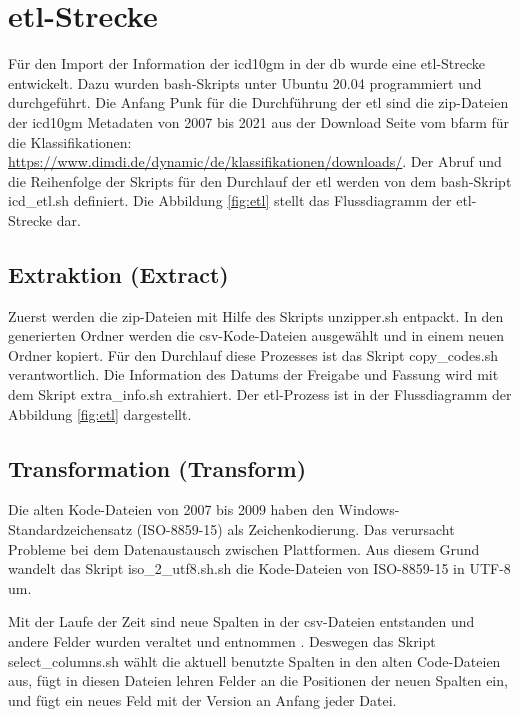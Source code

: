 \section{\acs{etl}-Strecke} \label{etlpipeline}

Für den Import der Information der \ac{icd10gm} in der \ac{db} wurde eine \ac{etl}-Strecke entwickelt. Dazu wurden \ac{bash}-Skripts unter Ubuntu 20.04 programmiert und durchgeführt. Die Anfang Punk für die Durchführung der \ac{etl} sind die \ac{zip}-Dateien der \ac{icd10gm} Metadaten von 2007 bis 2021 aus der Download Seite vom \ac{bfarm} für die Klassifikationen: \url{https://www.dimdi.de/dynamic/de/klassifikationen/downloads/}. Der Abruf und die Reihenfolge der Skripts für den Durchlauf der \ac{etl} werden von dem \ac{bash}-Skript {\ttfamily icd\_etl.sh} definiert. Die Abbildung \ref{fig:etl} stellt das Flussdiagramm der \ac{etl}-Strecke dar.

\subsection{Extraktion (Extract)}

Zuerst werden die \ac{zip}-Dateien mit Hilfe des Skripts {\ttfamily unzipper.sh} entpackt. In den generierten Ordner werden die \ac{csv}-Kode-Dateien ausgewählt und in einem neuen Ordner kopiert. Für den Durchlauf diese Prozesses ist das Skript {\ttfamily copy\_codes.sh} verantwortlich. Die Information des Datums der Freigabe und Fassung wird mit dem Skript {\ttfamily extra\_info.sh} extrahiert. Der \ac{etl}-Prozess ist in der Flussdiagramm der Abbildung \ref{fig:etl} dargestellt.

\subsection{Transformation (Transform)}

Die alten Kode-Dateien von 2007 bis 2009 haben den Windows-Standardzeichensatz (ISO-8859-15) als Zeichenkodierung. Das verursacht Probleme bei dem Datenaustausch zwischen Plattformen. Aus diesem Grund wandelt das Skript {\ttfamily iso\_2\_utf8.sh.sh} die Kode-Dateien von ISO-8859-15 in UTF-8 um.

Mit der Laufe der Zeit sind neue Spalten in der \ac{csv}-Dateien entstanden und andere Felder wurden veraltet und entnommen \cite{readme13, readme17}. Deswegen das Skript {\ttfamily select\_columns.sh} wählt die aktuell benutzte Spalten in den alten Code-Dateien aus, fügt in diesen Dateien lehren Felder an die Positionen der neuen Spalten ein, und fügt ein neues Feld mit der Version an Anfang jeder Datei.

